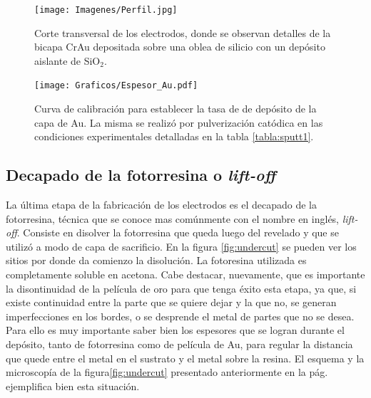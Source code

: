 {		 		%
						  \begin{figure}[h!]
						  \begin{center}
						  \texttt{[image: Imagenes/Perfil.jpg]}
						  \caption[Sección trasversal de los eletrodos]{Corte transversal de los electrodos, donde se observan detalles de la bicapa Cr\textbar Au depositada sobre una oblea de silicio con un depósito aislante de SiO$_2$.}
						  \label{fig:FIB_electrodos}
						  \end{center}
						  \end{figure} 	

					   		\begin{figure}[h!]
					   		\begin{center}
							\texttt{[image: Graficos/Espesor\_Au.pdf]}
							\caption[Curva de calibración para el espesor de los electrodos]{Curva de calibración para establecer la tasa de de depósito de la capa de Au. La misma se realizó por pulverización catódica en las condiciones experimentales detalladas en la tabla \ref{tabla:sputt1}.}
							\label{fig:calibracionAu}
							\end{center}
							\end{figure}		  
		
  		\subsection{Decapado de la fotorresina o\textit{ lift-off}}


		 La última etapa de la fabricación de los electrodos es el decapado de la fotorresina, técnica que se conoce mas comúnmente con el nombre en inglés, \textit{lift-off}. Consiste en disolver la fotorresina que queda luego del revelado y que se utilizó a modo de capa de sacrificio. En la figura \ref{fig:undercut} se pueden ver los sitios por donde da comienzo la disolución. La fotoresina utilizada es completamente soluble en acetona. Cabe destacar, nuevamente, que es importante la disontinuidad de la película de oro para que tenga éxito esta etapa, ya que, si existe continuidad entre la parte que se quiere dejar y la que no, se generan imperfecciones en los bordes, o se desprende el metal de partes que no se desea. Para ello es muy importante saber bien los espesores que se logran durante el depósito, tanto de fotorresina como de película de Au, para regular la distancia que quede entre el metal en el sustrato y el metal sobre la resina. El esquema y la microscopía de la figura\ref{fig:undercut} presentado anteriormente en la pág. \pageref{fig:undercut} ejemplifica bien esta situación.

}
